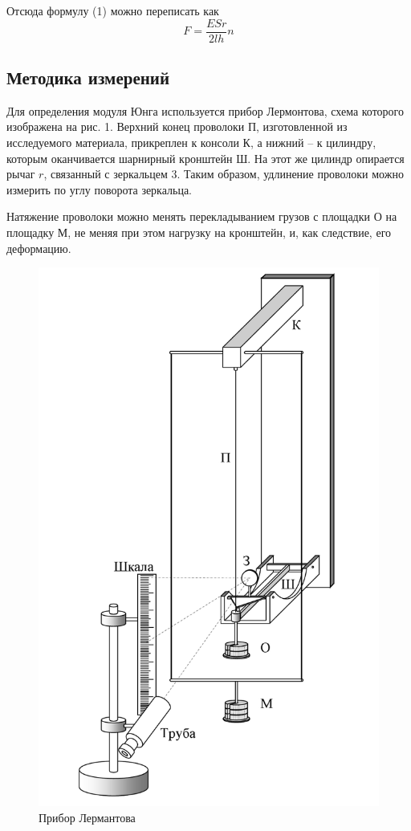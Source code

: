 \documentclass[12pt]{article}
\begin{document}
    Отсюда формулу (1) можно переписать как
    \begin{equation}
        F = \frac{ESr}{2lh}n
    \end{equation}

    \subsection{Методика измерений}
    \par Для определения модуля Юнга используется прибор Лермонтова,
    схема которого изображена на рис. 1. Верхний конец проволоки П, изготовленной
    из исследуемого материала, прикреплен к консоли К, а
    нижний -- к цилиндру, которым оканчивается шарнирный кронштейн
    Ш. На этот же цилиндр опирается рычаг $r$, связанный с зеркальцем
    3. Таким образом, удлинение проволоки можно измерить по углу
    поворота зеркальца.\\
    \par Натяжение проволоки можно менять перекладыванием грузов
    с площадки О на площадку М, не меняя при этом нагрузку на кронштейн,
    и, как следствие, его деформацию.

    \begin{figure}[H]
        \centering
        \includegraphics[scale = 0.3]{pictures/lermantov.png}
        \caption{Прибор Лермантова}
    \end{figure}
\end{document}
